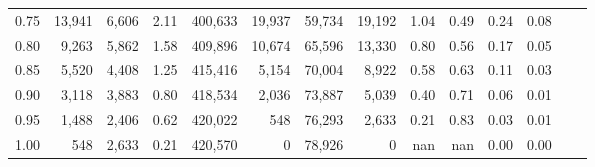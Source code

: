 \begin{tabular}{rrrrrrrrrrrrrr}
0.75 &  13,941 &  6,606 &    2.11 &  400,633 &   19,937 &  59,734 &  19,192 &  1.04 &  0.49 &  0.24 &      0.08 \\
0.80 &   9,263 &  5,862 &    1.58 &  409,896 &   10,674 &  65,596 &  13,330 &  0.80 &  0.56 &  0.17 &      0.05 \\
0.85 &   5,520 &  4,408 &    1.25 &  415,416 &    5,154 &  70,004 &   8,922 &  0.58 &  0.63 &  0.11 &      0.03 \\
0.90 &   3,118 &  3,883 &    0.80 &  418,534 &    2,036 &  73,887 &   5,039 &  0.40 &  0.71 &  0.06 &      0.01 \\
0.95 &   1,488 &  2,406 &    0.62 &  420,022 &      548 &  76,293 &   2,633 &  0.21 &  0.83 &  0.03 &      0.01 \\
1.00 &     548 &  2,633 &    0.21 &  420,570 &        0 &  78,926 &       0 &   nan &   nan &  0.00 &      0.00 \\
\bottomrule
\end{tabular}
